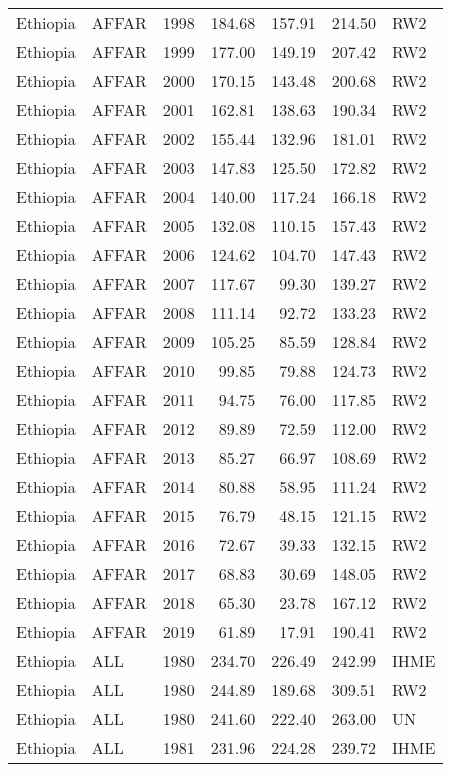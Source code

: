 \begin{longtable}{lllrrrl}
  Ethiopia & AFFAR & 1998 & 184.68 & 157.91 & 214.50 & RW2 \\ 
  Ethiopia & AFFAR & 1999 & 177.00 & 149.19 & 207.42 & RW2 \\ 
  Ethiopia & AFFAR & 2000 & 170.15 & 143.48 & 200.68 & RW2 \\ 
  Ethiopia & AFFAR & 2001 & 162.81 & 138.63 & 190.34 & RW2 \\ 
  Ethiopia & AFFAR & 2002 & 155.44 & 132.96 & 181.01 & RW2 \\ 
  Ethiopia & AFFAR & 2003 & 147.83 & 125.50 & 172.82 & RW2 \\ 
  Ethiopia & AFFAR & 2004 & 140.00 & 117.24 & 166.18 & RW2 \\ 
  Ethiopia & AFFAR & 2005 & 132.08 & 110.15 & 157.43 & RW2 \\ 
  Ethiopia & AFFAR & 2006 & 124.62 & 104.70 & 147.43 & RW2 \\ 
  Ethiopia & AFFAR & 2007 & 117.67 & 99.30 & 139.27 & RW2 \\ 
  Ethiopia & AFFAR & 2008 & 111.14 & 92.72 & 133.23 & RW2 \\ 
  Ethiopia & AFFAR & 2009 & 105.25 & 85.59 & 128.84 & RW2 \\ 
  Ethiopia & AFFAR & 2010 & 99.85 & 79.88 & 124.73 & RW2 \\ 
  Ethiopia & AFFAR & 2011 & 94.75 & 76.00 & 117.85 & RW2 \\ 
  Ethiopia & AFFAR & 2012 & 89.89 & 72.59 & 112.00 & RW2 \\ 
  Ethiopia & AFFAR & 2013 & 85.27 & 66.97 & 108.69 & RW2 \\ 
  Ethiopia & AFFAR & 2014 & 80.88 & 58.95 & 111.24 & RW2 \\ 
  Ethiopia & AFFAR & 2015 & 76.79 & 48.15 & 121.15 & RW2 \\ 
  Ethiopia & AFFAR & 2016 & 72.67 & 39.33 & 132.15 & RW2 \\ 
  Ethiopia & AFFAR & 2017 & 68.83 & 30.69 & 148.05 & RW2 \\ 
  Ethiopia & AFFAR & 2018 & 65.30 & 23.78 & 167.12 & RW2 \\ 
  Ethiopia & AFFAR & 2019 & 61.89 & 17.91 & 190.41 & RW2 \\ 
  Ethiopia & ALL & 1980 & 234.70 & 226.49 & 242.99 & IHME \\ 
  Ethiopia & ALL & 1980 & 244.89 & 189.68 & 309.51 & RW2 \\ 
  Ethiopia & ALL & 1980 & 241.60 & 222.40 & 263.00 & UN \\ 
  Ethiopia & ALL & 1981 & 231.96 & 224.28 & 239.72 & IHME \\ 

\end{longtable}
